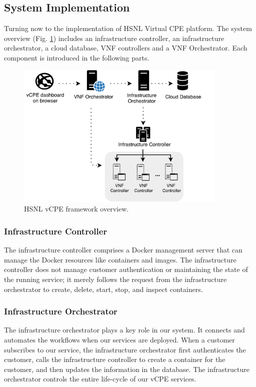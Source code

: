 \subsection{System Implementation} \label{ssec:hsnl_system_imple}
Turning now to the implementation of HSNL Virtual CPE platform.  The system overview (Fig. \ref{fig:hsnl_vcpe_framework}) includes an infrastructure controller, an infrastructure orchestrator, a cloud database, VNF controllers and a VNF Orchestrator. Each component is introduced in the following parts.

\begin{figure}[!t]
\centering
\includegraphics[width=0.9\textwidth]{./fig/hsnl_vcpe_framework}
\caption{HSNL vCPE framework overview.}
\label{fig:hsnl_vcpe_framework}
\end{figure}

\subsubsection{Infrastructure Controller}
The infrastructure controller comprises a Docker management server that can manage the Docker resources like containers and images. The infrastructure controller does not manage customer authentication or maintaining the state of the running service; it merely follows the request from the infrastructure orchestrator to create, delete, start, stop, and inspect containers.

\subsubsection{Infrastructure Orchestrator}
The infrastructure orchestrator plays a key role in our system. It connects and automates the workflows when our services are deployed. When a customer subscribes to our service, the infrastructure orchestrator first authenticates the customer, calls the infrastructure controller to create a container for the customer, and then updates the information in the database. The infrastructure orchestrator controls the entire life-cycle of our vCPE services.

